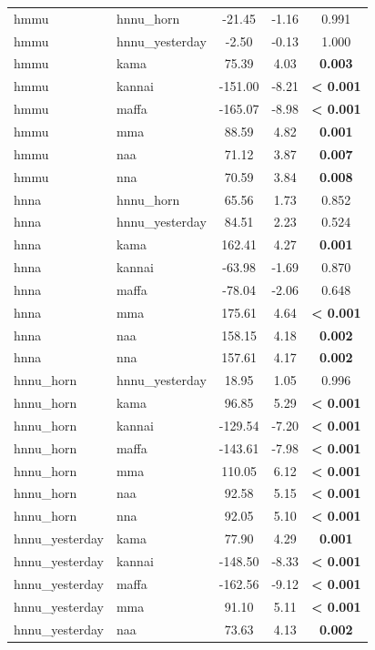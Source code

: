 \documentclass[output=paper]{langscibook}
\begin{document}
\begin{paperappendix}
{\begin{longtable}{l @{  vs. } l S[table-format=-3.2] S[table-format=-2.3] S[table-format=<1.3]}
		hmmu  &  hnnu\_horn & -21.45 & -1.16 & 0.991\\
		hmmu  &  hnnu\_yesterday & -2.50 & -0.13 & 1.000\\
		hmmu  &  kama & 75.39 & 4.03 &  \bfseries 0.003\\
		hmmu  &  kannai & -151.00 & -8.21 &  \bfseries < 0.001\\
		hmmu  &  maffa & -165.07 & -8.98 &  \bfseries < 0.001\\
		hmmu  &  mma & 88.59 & 4.82 &  \bfseries 0.001\\
		hmmu  &  naa & 71.12 & 3.87 &  \bfseries 0.007\\
		hmmu  &  nna & 70.59 & 3.84 &  \bfseries 0.008\\
		hnna  &  hnnu\_horn & 65.56 & 1.73 & 0.852\\
		hnna  &  hnnu\_yesterday & 84.51 & 2.23 & 0.524\\
		hnna  &  kama & 162.41 & 4.27 & \bfseries 0.001\\
		hnna  &  kannai & -63.98 & -1.69 & 0.870\\
		hnna  &  maffa & -78.04 & -2.06 & 0.648\\
		hnna  &  mma & 175.61 & 4.64 &  \bfseries < 0.001\\
		hnna  &  naa & 158.15 & 4.18 &  \bfseries 0.002\\
		hnna  &  nna & 157.61 & 4.17 &  \bfseries 0.002\\
		hnnu\_horn  &  hnnu\_yesterday & 18.95 & 1.05 & 0.996\\
		hnnu\_horn  &  kama & 96.85 & 5.29 &  \bfseries < 0.001\\
		hnnu\_horn  &  kannai & -129.54 & -7.20 &  \bfseries < 0.001\\
		hnnu\_horn  &  maffa & -143.61 & -7.98 &  \bfseries < 0.001\\
		hnnu\_horn  &  mma & 110.05 & 6.12 &  \bfseries < 0.001\\
		hnnu\_horn  &  naa & 92.58 & 5.15 &  \bfseries < 0.001\\
		hnnu\_horn  &  nna & 92.05 & 5.10 &  \bfseries < 0.001\\
		hnnu\_yesterday  &  kama & 77.90 & 4.29 &  \bfseries 0.001\\
		hnnu\_yesterday  &  kannai & -148.50 & -8.33 &  \bfseries < 0.001\\
		hnnu\_yesterday  &  maffa & -162.56 & -9.12 &  \bfseries < 0.001\\
		hnnu\_yesterday  &  mma & 91.10 & 5.11 &  \bfseries < 0.001\\
		hnnu\_yesterday  &  naa & 73.63 & 4.13 &  \bfseries 0.002\\

\end{longtable}}
\end{paperappendix}
\end{document}
